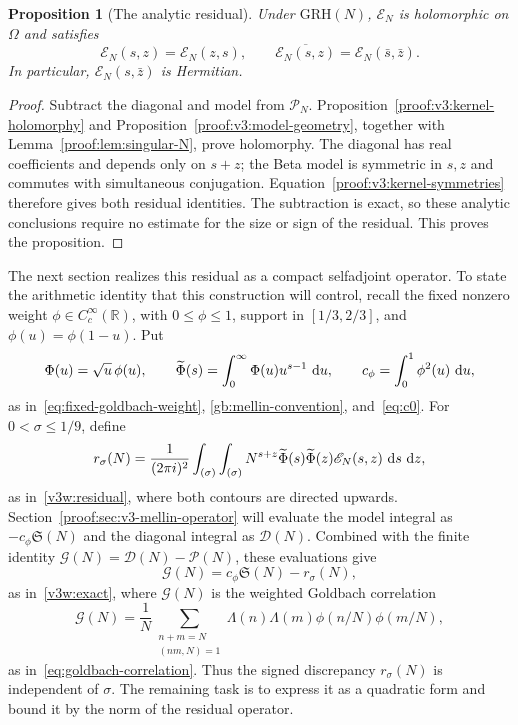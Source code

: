 \documentclass[12pt,a4paper]{amsart}
\numberwithin{equation}{section}
\def\d{\,{\rm d}}
\def\le{\leqslant}
\theoremstyle{plain}
\newtheorem{proposition}{Proposition}[section]
\theoremstyle{definition}
\theoremstyle{remark}
\begin{document}
\begin{proposition}[The analytic residual]\label{proof:v7:residual-holomorphy}
Under $\mathrm{GRH}(N)$, $\mathscr E_N$ is holomorphic on
$\Omega$ and satisfies
\[
 \mathscr E_N(s,z)=\mathscr E_N(z,s),\qquad
 \overline{\mathscr E_N(s,z)}=\mathscr E_N(\bar s,\bar z).
\]
In particular, $\mathscr E_N(s,\bar z)$ is Hermitian.
\end{proposition}

\begin{proof}
Subtract the diagonal and model from $\mathscr P_N$.
Proposition~\ref{proof:v3:kernel-holomorphy} and
Proposition~\ref{proof:v3:model-geometry}, together with
Lemma~\ref{proof:lem:singular-N}, prove
holomorphy. The diagonal has real coefficients and depends only on
$s+z$; the Beta model is symmetric in $s,z$ and commutes with
simultaneous conjugation. Equation~\eqref{proof:v3:kernel-symmetries}
therefore gives both residual identities.
The subtraction is exact, so these analytic conclusions require
no estimate for the size or sign of the residual.
This proves the proposition.
\end{proof}

The next section realizes this residual as a compact selfadjoint
operator. To state the arithmetic identity that this construction
will control, recall the fixed nonzero weight
$\phi\in C_c^\infty(\mathbb R)$, with $0\le\phi\le1$,
support in $[1/3,2/3]$, and $\phi(u)=\phi(1-u)$. Put
\[
 \Phi(u)=\sqrt u\,\phi(u),\qquad
 \widetilde\Phi(s)=\int_0^\infty\Phi(u)u^{s-1}\,\d u,
 \qquad c_\phi=\int_0^1\phi^2(u)\,\d u,
\]
as in~\eqref{eq:fixed-goldbach-weight}, \eqref{gb:mellin-convention}, and~\eqref{eq:c0}.
For $0<\sigma\le1/9$, define
\[
 r_\sigma(N)=\frac1{(2\pi i)^2}
 \int_{(\sigma)}\int_{(\sigma)}
 N^{s+z}\widetilde\Phi(s)\widetilde\Phi(z)
 \mathscr E_N(s,z)\,\d s\,\d z,
\]
as in~\eqref{v3w:residual},
where both contours are directed upwards.
Section~\ref{proof:sec:v3-mellin-operator} will evaluate the
model integral as $-c_\phi\mathfrak S(N)$ and the diagonal
integral as $\mathcal D(N)$. Combined with the finite identity
$\mathcal G(N)=\mathcal D(N)-\mathcal P(N)$, these evaluations give
\[
 \mathcal G(N)=c_\phi\mathfrak S(N)-r_\sigma(N),
\]
as in~\eqref{v3w:exact},
where $\mathcal G(N)$ is the weighted Goldbach correlation
\[
 \mathcal G(N)=\frac1N
 \sum_{\substack{n+m=N\\(nm,N)=1}}
 \Lambda(n)\Lambda(m)\phi(n/N)\phi(m/N),
\]
as in~\eqref{eq:goldbach-correlation}.
Thus the signed discrepancy $r_\sigma(N)$ is independent of
$\sigma$. The remaining task is to express it as a quadratic
form and bound it by the norm of the residual operator.
\end{document}
